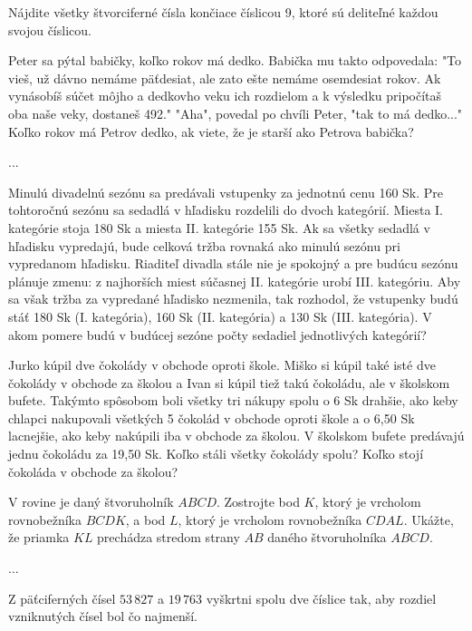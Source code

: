 {%
Nájdite všetky štvorciferné čísla končiace číslicou 9, ktoré sú deliteľné každou svojou
číslicou.}

{%
Peter sa pýtal babičky, koľko rokov má dedko. Babička mu takto odpovedala: "To vieš, už
dávno nemáme päťdesiat, ale zato ešte nemáme osemdesiat rokov. Ak vynásobíš súčet môjho
a dedkovho veku ich rozdielom a k výsledku pripočítaš oba naše veky, dostaneš 492."
"Aha", povedal po chvíli Peter, "tak to má dedko..."
Koľko rokov má Petrov dedko, ak viete, že je starší ako Petrova babička?}

{%
...}

{%
Minulú divadelnú sezónu sa predávali vstupenky za jednotnú cenu 160 Sk. Pre tohtoročnú
sezónu sa sedadlá v hľadisku rozdelili do dvoch kategórií. Miesta I. kategórie stoja 180 Sk
a miesta II. kategórie 155 Sk. Ak sa všetky sedadlá v hľadisku vypredajú, bude celková tržba
rovnaká ako minulú sezónu pri vypredanom hľadisku. Riaditeľ divadla stále nie je spokojný
a pre budúcu sezónu plánuje zmenu: z najhorších miest súčasnej II. kategórie urobí
III. kategóriu. Aby sa však tržba za vypredané hľadisko nezmenila, tak rozhodol, že
vstupenky budú stáť 180 Sk (I. kategória), 160 Sk (II. kategória) a 130 Sk (III. kategória).
V akom pomere budú v budúcej sezóne počty sedadiel jednotlivých kategórií?}

{%
Jurko kúpil dve čokolády v obchode oproti škole. Miško si kúpil také isté dve čokolády
v obchode za školou a Ivan si kúpil tiež takú čokoládu, ale v školskom bufete. Takýmto
spôsobom boli všetky tri nákupy spolu o 6 Sk drahšie, ako keby chlapci nakupovali všetkých
5 čokolád v obchode oproti škole a o 6,50 Sk lacnejšie, ako keby nakúpili iba v obchode za
školou. V školskom bufete predávajú jednu čokoládu za 19,50 Sk. Koľko stáli všetky
čokolády spolu? Koľko stojí čokoláda v obchode za školou?}

{%
V rovine je daný štvoruholník $ABCD$. Zostrojte bod $K$, ktorý je vrcholom rovnobežníka
$BCDK$, a bod $L$, ktorý je vrcholom rovnobežníka $CDAL$. Ukážte, že priamka $KL$ prechádza
stredom strany $AB$ daného štvoruholníka $ABCD$.}

{%
...}

{%
Z päťciferných čísel $53\,827$ a $19\,763$ vyškrtni spolu dve číslice tak, aby rozdiel
vzniknutých čísel bol čo najmenší.}

